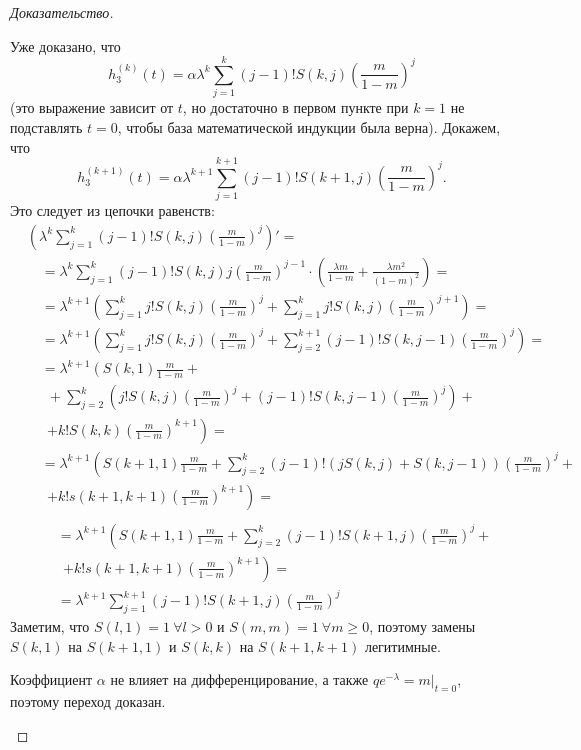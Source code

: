 \documentclass[12pt, specialist, subf, substylefile = spbu_report.rtx]{disser}
\begin{document}
\begin{proof}[Доказательство]
\begin{enumerate}
			Уже доказано, что
			\[
				h _3 ^{(k)} (t) = \alpha \lambda ^k \sum \limits _{j = 1} ^{k} (j - 1)! S(k, j) \left(\frac m {1 - m}\right) ^j
			\]
			(это выражение зависит от $t$, но достаточно в первом пункте при $k = 1$ не подставлять $t = 0$, чтобы база математической индукции была верна). Докажем, что
			\[
				h _3 ^{(k + 1)} (t) = \alpha \lambda ^{k + 1} \sum \limits _{j = 1} ^{k + 1} (j - 1)! S(k + 1, j) \left(\frac m {1 - m}\right) ^j.
			\]
			Это следует из цепочки равенств:
			\[
				\begin{aligned}
					&\left(\lambda ^k \sum \limits _{j = 1} ^{k} (j - 1)! S(k, j) \left(\frac m {1 - m}\right) ^j\right)' =\\
					&\quad= \lambda ^k \sum \limits _{j = 1} ^{k} (j - 1)! S(k, j) j \left(\frac m {1 - m}\right) ^{j - 1} \cdot \left(\frac {\lambda m} {1 - m} + \frac {\lambda m ^2} {(1 - m) ^2}\right) =\\
					&\quad= \lambda ^{k + 1} \left(\sum \limits _{j = 1} ^{k} j! S(k, j) \left(\frac m {1 - m}\right) ^j + \sum \limits _{j = 1} ^{k} j! S(k, j) \left(\frac m {1 - m}\right) ^{j + 1}\right) =\\
					&\quad= \lambda ^{k + 1} \left(\sum \limits _{j = 1} ^{k} j! S(k, j) \left(\frac m {1 - m}\right) ^j + \sum \limits _{j = 2} ^{k + 1} (j - 1)! S(k, j - 1) \left(\frac m {1 - m}\right) ^j\right) =\\
					&\quad= \lambda ^{k + 1} \left(S(k, 1) \frac m {1 - m} +\right.\\
					&\quad~~ + \sum \limits _{j = 2} ^{k} \left(j! S(k, j) \left(\frac m {1 - m}\right) ^j + (j - 1)! S(k, j - 1) \left(\frac m {1 - m}\right) ^j\right) +\\
					&\quad~~ \left.+ k ! S (k, k) \left(\frac m {1 - m}\right) ^{k + 1}\right) =\\
					&\quad= \lambda ^{k + 1} \left(S(k + 1, 1) \frac m {1 - m} + \sum \limits _{j = 2} ^{k} (j - 1)! \left(j S(k, j) + S(k, j - 1)\right) \left(\frac m {1 - m}\right) ^j +\right.\\
					&\quad~~\left.+ k ! s (k + 1, k + 1) \left(\frac m {1 - m}\right) ^{k + 1}\right) =\\
				\end{aligned}
			\]
			\[
				\begin{aligned}
					&\quad= \lambda ^{k + 1} \left(S(k + 1, 1) \frac m {1 - m} + \sum \limits _{j = 2} ^{k} (j - 1)! S(k + 1, j) \left(\frac m {1 - m}\right) ^j +\right.\\
					&\quad~~\left.+ k ! s (k + 1, k + 1) \left(\frac m {1 - m}\right) ^{k + 1}\right) =\\
					&\quad=\lambda ^{k + 1} \sum \limits _{j = 1} ^{k + 1} (j - 1)! S(k + 1, j) \left(\frac m {1 - m}\right) ^j
				\end{aligned}
			\]
			Заметим, что $S(l, 1) = 1~ \forall l > 0$ и $S(m, m) = 1~ \forall m \geqslant 0$, поэтому замены $S(k, 1)$ на $S(k + 1, 1)$ и $S(k, k)$ на $S(k + 1, k + 1)$ легитимные.
			
			Коэффициент $\alpha$ не влияет на дифференцирование, а также $q e ^{-\lambda} = m | _{t = 0}$, поэтому переход доказан.
		\end{enumerate}
	\end{proof}
\end{document}
